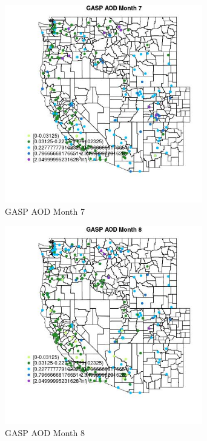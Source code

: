 \begin{figure} 
\centering  
\includegraphics[width=0.77\textwidth]{Code_Outputs/Report_ML_input_PM25_Step4_part_e_de_duplicated_aveswNAs_MapObsMo7GASP_AOD.jpg} 
\caption{\label{fig:Report_ML_input_PM25_Step4_part_e_de_duplicated_aveswNAsMapObsMo7GASP_AOD}GASP AOD Month 7} 
\end{figure} 
 

\clearpage 

\begin{figure} 
\centering  
\includegraphics[width=0.77\textwidth]{Code_Outputs/Report_ML_input_PM25_Step4_part_e_de_duplicated_aveswNAs_MapObsMo8GASP_AOD.jpg} 
\caption{\label{fig:Report_ML_input_PM25_Step4_part_e_de_duplicated_aveswNAsMapObsMo8GASP_AOD}GASP AOD Month 8} 
\end{figure} 
 

